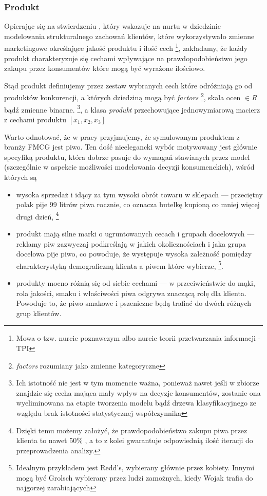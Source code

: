 \documentclass[polish, twoside, 12pt, a4paper]{article}
\theoremstyle{definition}
\theoremstyle{plain}
\theoremstyle{remark}
\begin{document}
\subsubsection{Produkt}

Opierając się na stwierdzeniu \cite{Sagan2011}, który wskazuje na nurtu w dziedzinie modelowania strukturalnego zachowań klientów, które wykorzystywało zmienne marketingowe określające jakość produktu i ilość cech \footnote{Mowa o tzw. nurcie poznawczym albo nurcie teorii przetwarzania informacji - TPI}, zakładamy, że każdy produkt charakteryzuje się cechami wpływające na prawdopodobieństwo jego zakupu przez konsumentów które mogą być wyrażone ilościowo. 

Stąd produkt definiujemy przez zestaw wybranych cech które odróżniają go od produktów konkurencji, a których dziedziną mogą być \textit{factors} \footnote{\textit{factors} rozumiany jako zmienne kategoryczne}, skala ocen $\in R$ bądź zmienne binarne. \footnote{Ich istotność nie jest w tym momencie ważna, ponieważ nawet jeśli w zbiorze znajdzie się cecha mająca mały wpływ na decyzje konsumentów, zostanie ona wyeliminowana na etapie tworzenia modelu bądź drzewa klasyfikacyjnego ze względu brak istotności statystycznej współczynnika}, a klasa \textit{produkt} przechowujące jednowymiarową macierz z cechami produktu $[x_1,x_2,x_3]$

Warto odnotować, że w pracy przyjmujemy, że symulowanym produktem z branży FMCG jest piwo. Ten dość nieelegancki wybór motywowany jest głównie specyfiką produktu, która dobrze pasuje do wymagań stawianych przez model (szczególnie w aspekcie możliwości modelowania decyzji konsumenckich), wśród których są 

	\begin{itemize}
			\item wysoka sprzedaż i idący za tym wysoki obrót towaru w sklepach --- przeciętny polak pije 99 litrów piwa rocznie, co oznacza butelkę kupioną co mniej więcej drugi dzień, \footnote{Dzięki temu możemy założyć, że prawdopodobieństwo zakupu piwa przez klienta to nawet 50\% , a to z kolei gwarantuje odpowiednią ilość iteracji do przeprowadzenia analizy.} 
			\item produkt mają silne marki o ugruntowanych cecach i grupach docelowych --- reklamy piw zazwyczaj podkreślają w jakich okolicznościach i jaka grupa docelowa pije piwo, co powoduje, że występuje wysoka zależność pomiędzy charakterystyką demograficzną klienta a piwem które wybierze, \footnote{Idealnym przykładem jest Redd's, wybierany głównie przez kobiety. Innymi mogą być Grolsch wybierany przez ludzi zamożnych, kiedy Wojak trafia do najgorzej zarabiających}. 
			\item produkty mocno różnią się od siebie cechami --- w przeciwieństwie do mąki, rola jakości, smaku i właściwości piwa odgrywa znaczącą rolę dla klienta. Powoduje to, że piwo smakowe i pszeniczne będą trafiać do dwóch różnych grup klientów.
	\end{itemize}
\end{document}
